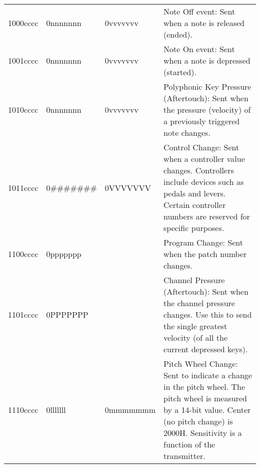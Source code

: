         \begin{center}
        \tablelasttail{\hline}
        \begin{supertabular}{| C{2cm} | C{2cm} | C{2.3cm} | C{8cm} |}
             1000cccc & 0nnnnnnn & 0vvvvvvv & Note Off event: Sent when a note is released (ended). \\
                1001cccc & 0nnnnnnn & 0vvvvvvv & Note On event: Sent when a note is depressed (started). \\
             1010cccc & 0nnnnnnn & 0vvvvvvv & Polyphonic Key Pressure (Aftertouch): Sent when the pressure (velocity) of a previously triggered note changes. \\
                1011cccc & 0\#\#\#\#\#\#\# & 0VVVVVVV & Control Change: Sent when a controller value changes. Controllers include devices such as pedals and levers. Certain controller numbers are reserved for specific purposes. \\
             1100cccc & 0ppppppp &  & Program Change: Sent when the patch number changes. \\
                1101cccc & 0PPPPPPP &  & Channel Pressure (Aftertouch): Sent when the channel pressure changes. Use this to send the single greatest velocity (of all the current depressed keys). \\
             1110cccc & 0lllllll & 0mmmmmmm & Pitch Wheel Change: Sent to indicate a change in the pitch wheel. The pitch wheel is measured by a 14-bit value. Center (no pitch change) is 2000H. Sensitivity is a function of the transmitter. \\
        \end{supertabular}
        \end{center}

